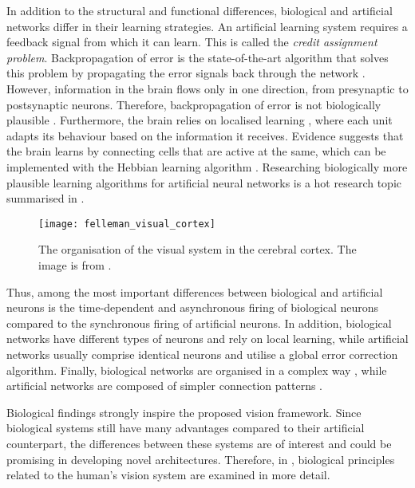 In addition to the structural and functional differences, biological and artificial networks differ in their learning strategies.
An artificial learning system requires a feedback signal from which it can learn.
This is called the \emph{credit assignment problem}.
Backpropagation of error  is the state-of-the-art algorithm that solves this problem by propagating the error signals back through the network .
However, information in the brain flows only in one direction, from presynaptic to postsynaptic neurons.
Therefore, backpropagation of error is not biologically plausible .
Furthermore, the brain relies on localised learning , where each unit adapts its behaviour based on the information it receives.
Evidence suggests that the brain learns by connecting cells that are active at the same, which can be implemented with the Hebbian learning algorithm .
Researching biologically more plausible learning algorithms for artificial neural networks is a hot research topic summarised in .

\begin{figure}[h]
    \centering
    \texttt{[image: felleman\_visual\_cortex]}
    \caption[Organisation of the visual system in the cerebral cortex]{The organisation of the visual system in the cerebral cortex. The image is from .}
\end{figure}

Thus, among the most important differences between biological and artificial neurons is the time-dependent and asynchronous firing of biological neurons compared to the synchronous firing of artificial neurons. In addition, biological networks have different types of neurons and rely on local learning, while artificial networks usually comprise identical neurons and utilise a global error correction algorithm. Finally, biological networks are organised in a complex way , while artificial networks are composed of simpler connection patterns .

Biological findings strongly inspire the proposed vision framework.
Since biological systems still have many advantages compared to their artificial counterpart, the differences between these systems are of interest and could be promising in developing novel architectures.
Therefore, in , biological principles related to the human's vision system are examined in more detail.

